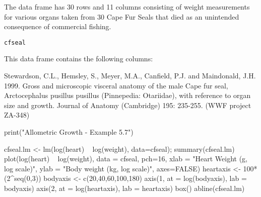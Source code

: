 \begin{Description}\relax
The  data frame has 30 rows and 11 columns consisting
of weight measurements for various organs taken from 30 Cape Fur
Seals that died as an unintended consequence of commercial fishing.
\end{Description}
\begin{Usage}
\begin{verbatim}cfseal\end{verbatim}
\end{Usage}
\begin{Format}\relax
This data frame contains the following columns:
\end{Format}
\begin{Source}\relax
Stewardson, C.L., Hemsley, S., Meyer, M.A., Canfield,
P.J. and Maindonald, J.H. 1999.  Gross and microscopic visceral
anatomy of the male Cape fur seal, Arctocephalus pusillus pusillus
(Pinnepedia: Otariidae), with reference to organ size and growth.
Journal of Anatomy (Cambridge) 195: 235-255.  (WWF project ZA-348)
\end{Source}
\begin{Examples}
\begin{ExampleCode}
print("Allometric Growth - Example 5.7")

cfseal.lm <- lm(log(heart) ~ log(weight), data=cfseal); summary(cfseal.lm)
plot(log(heart) ~ log(weight), data = cfseal, pch=16, xlab = "Heart Weight (g, log scale)", 
ylab = "Body weight (kg, log scale)", axes=FALSE)
heartaxis <- 100*(2^seq(0,3))
bodyaxis <- c(20,40,60,100,180)
axis(1, at = log(bodyaxis), lab = bodyaxis)
axis(2, at = log(heartaxis), lab = heartaxis)
box()
abline(cfseal.lm)
\end{ExampleCode}
\end{Examples}

